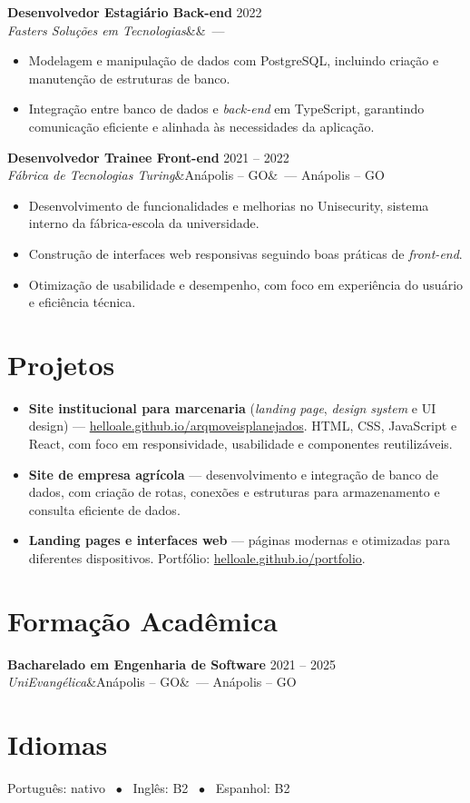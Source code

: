 \documentclass[10.5pt,a4paper]{article}
\newcommand{\entry}[4]{%
  \textbf{#1} \hfill #4\\
  \textit{#2}\ifx&#3&\else\ --- #3\fi\par\vspace{1pt}}
\begin{document}
\vspace{3pt}
\entry{Desenvolvedor Estagiário Back-end}{Fasters Soluções em Tecnologias}{}{2022}
\begin{itemize}
  \item Modelagem e manipulação de dados com PostgreSQL, incluindo criação e manutenção de estruturas de banco.
  \item Integração entre banco de dados e \textit{back-end} em TypeScript, garantindo comunicação eficiente e alinhada às necessidades da aplicação.
\end{itemize}

\vspace{3pt}
\entry{Desenvolvedor Trainee Front-end}{Fábrica de Tecnologias Turing}{Anápolis -- GO}{2021 -- 2022}
\begin{itemize}
  \item Desenvolvimento de funcionalidades e melhorias no Unisecurity, sistema interno da fábrica-escola da universidade.
  \item Construção de interfaces web responsivas seguindo boas práticas de \textit{front-end}.
  \item Otimização de usabilidade e desempenho, com foco em experiência do usuário e eficiência técnica.
\end{itemize}

\section{Projetos}
\begin{itemize}
  \item \textbf{Site institucional para marcenaria} (\textit{landing page}, \textit{design system} e UI design) --- \href{https://helloale.github.io/arqmoveisplanejados/}{helloale.github.io/arqmoveisplanejados}. HTML, CSS, JavaScript e React, com foco em responsividade, usabilidade e componentes reutilizáveis.
  \item \textbf{Site de empresa agrícola} --- desenvolvimento e integração de banco de dados, com criação de rotas, conexões e estruturas para armazenamento e consulta eficiente de dados.
  \item \textbf{Landing pages e interfaces web} --- páginas modernas e otimizadas para diferentes dispositivos. Portfólio: \href{https://helloale.github.io/portfolio}{helloale.github.io/portfolio}.
\end{itemize}

\section{Formação Acadêmica}
\entry{Bacharelado em Engenharia de Software}{UniEvangélica}{Anápolis -- GO}{2021 -- 2025}

\section{Idiomas}
Português: nativo \ $\bullet$ \ Inglês: B2 \ $\bullet$ \ Espanhol: B2
\end{document}
